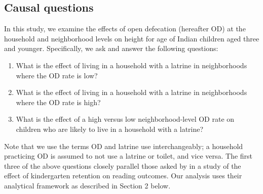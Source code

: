 \documentclass[12pt,a4paper,titlepage]{article}
\begin{document}

\subsection{Causal questions}
In this study, we examine the effects of open defecation (hereafter OD) at the household and neighborhood levels on height for age of Indian children aged three and younger. Specifically, we ask and answer the following questions:
\begin{enumerate}
	\item What is the effect of living in a household with a latrine in neighborhoods where the OD rate is low?
	\item What is the effect of living in a household with a latrine in neighborhoods where the OD rate is high?
	\item What is the effect of a high versus low neighborhood-level OD rate on children who are likely to live in a household with a latrine?
\end{enumerate}
Note that we use the terms OD and latrine use interchangeably; a household practicing OD is assumed to not use a latrine or toilet, and vice versa. The first three of the above questions closely parallel those asked by \cite{hong_raudenbush} in a study of the effect of kindergarten retention on reading outcomes. Our analysis uses their analytical framework as described in Section 2 below.
\end{document}
